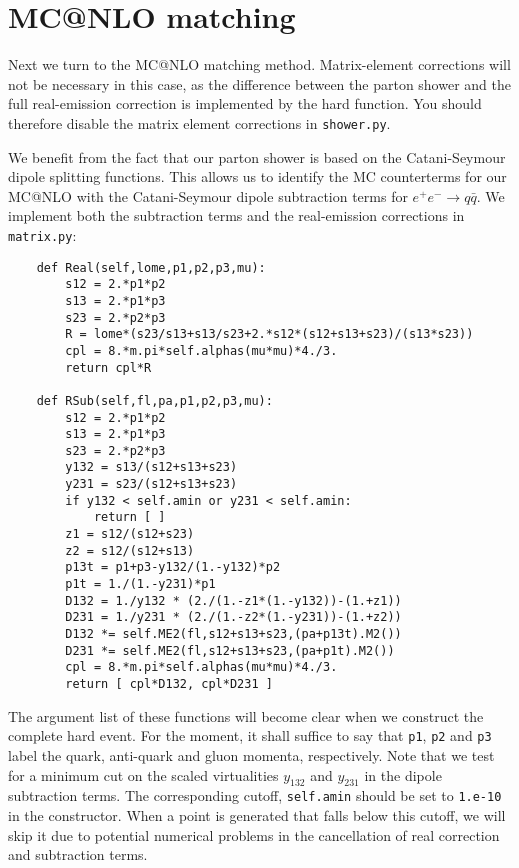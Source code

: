 \documentclass[10pt,fleqn]{scrartcl}
\begin{document}
\section{MC@NLO matching}
Next we turn to the MC@NLO matching method. Matrix-element corrections will 
not be necessary in this case, as the difference between the parton shower 
and the full real-emission correction is implemented by the hard function. 
You should therefore disable the matrix element corrections in {\tt shower.py}.

We benefit from the fact that our parton shower is based on the 
Catani-Seymour dipole splitting functions. This allows us to identify
the MC counterterms for our MC@NLO with the Catani-Seymour dipole
subtraction terms for $e^+e^-\to q\bar{q}$. We implement both the
subtraction terms and the real-emission corrections in {\tt matrix.py}:
\begin{verbatim}
    def Real(self,lome,p1,p2,p3,mu):
        s12 = 2.*p1*p2
        s13 = 2.*p1*p3
        s23 = 2.*p2*p3
        R = lome*(s23/s13+s13/s23+2.*s12*(s12+s13+s23)/(s13*s23))
        cpl = 8.*m.pi*self.alphas(mu*mu)*4./3.
        return cpl*R

    def RSub(self,fl,pa,p1,p2,p3,mu):
        s12 = 2.*p1*p2
        s13 = 2.*p1*p3
        s23 = 2.*p2*p3
        y132 = s13/(s12+s13+s23)
        y231 = s23/(s12+s13+s23)
        if y132 < self.amin or y231 < self.amin:
            return [ ]
        z1 = s12/(s12+s23)
        z2 = s12/(s12+s13)
        p13t = p1+p3-y132/(1.-y132)*p2
        p1t = 1./(1.-y231)*p1
        D132 = 1./y132 * (2./(1.-z1*(1.-y132))-(1.+z1))
        D231 = 1./y231 * (2./(1.-z2*(1.-y231))-(1.+z2))
        D132 *= self.ME2(fl,s12+s13+s23,(pa+p13t).M2())
        D231 *= self.ME2(fl,s12+s13+s23,(pa+p1t).M2())
        cpl = 8.*m.pi*self.alphas(mu*mu)*4./3.
        return [ cpl*D132, cpl*D231 ]
\end{verbatim}
The argument list of these functions will become clear when we construct 
the complete hard event. For the moment, it shall suffice to say that
{\tt p1}, {\tt p2} and {\tt p3} label the quark, anti-quark and gluon
momenta, respectively. Note that we test for a minimum cut on the scaled
virtualities $y_{132}$ and $y_{231}$ in the dipole subtraction terms. 
The corresponding cutoff, \verb!self.amin! should be set to \verb!1.e-10! 
in the constructor. When a point is generated that falls below this cutoff, 
we will skip it due to potential numerical problems in the cancellation 
of real correction and subtraction terms.
\end{document}
